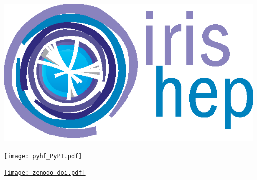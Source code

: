 \documentclass[a0paper,fleqn]{betterposter}
\begin{document}
{ \vspace{1em}
 \vfill
 \begin{minipage}{0.58\textwidth}
  \begin{center}
   \href{http://iris-hep.org/}{\includegraphics[width=\textwidth]{IRIS-HEP_logo}}
  \end{center}
 \end{minipage}%
 \quad
 \begin{minipage}{0.38\textwidth}
  \begin{center}
   \href{https://pypi.org/project/pyhf/}{\texttt{[image: pyhf\_PyPI.pdf]}}
  \end{center}
  \vspace{1em}
  \begin{center}
   \href{https://doi.org/10.5281/zenodo.1169739}{\texttt{[image: zenodo\_doi.pdf]}}
  \end{center}
  \vspace{3em}
 \end{minipage}%
}
\end{document}
